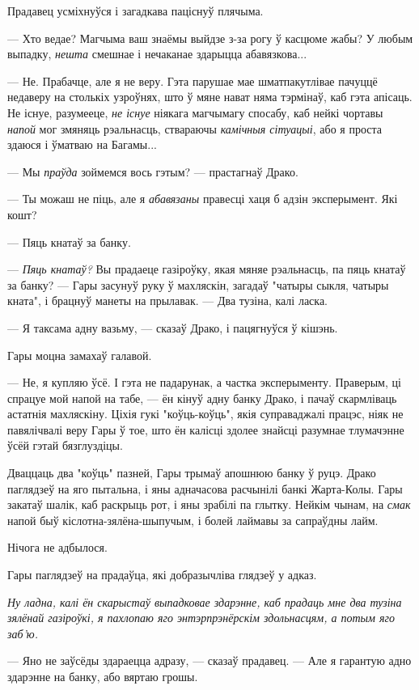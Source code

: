Прадавец усміхнуўся і загадкава паціснуў плячыма.

--- Хто ведае? Магчыма ваш знаёмы выйдзе з-за рогу ў касцюме жабы?
У любым выпадку, \emph{нешта} смешнае і нечаканае здарыцца абавязкова...

--- Не. Прабачце, але я не веру. Гэта парушае мае шматпакутлівае пачуццё недаверу на
столькіх узроўнях, што ў мяне нават няма тэрмінаў, каб гэта апісаць.
Не існуе, разумееце, \emph{не існуе} ніякага магчымагу спосабу, каб нейкі
чортавы \emph{напой} мог змяняць рэальнасць, ствараючы \emph{камічныя сітуацыі}, 
або я проста здаюся і ўматваю на Багамы...

--- Мы \emph{праўда} зоймемся вось гэтым? --- прастагнаў Драко.

--- Ты можаш не піць, але я \emph{абавязаны} правесці хаця б адзін эксперымент. 
Які кошт?

--- Пяць кнатаў за банку.

--- \emph{Пяць кнатаў?} Вы прадаеце газіроўку, якая мяняе рэальнасць, па пяць кнатаў
за банку? --- Гары засунуў руку ў махляскін, загадаў "чатыры сыкля, чатыры кната",
і брацнуў манеты на прылавак. --- Два тузіна, калі ласка.

--- Я таксама адну вазьму, --- сказаў Драко, і пацягнуўся ў кішэнь.

Гары моцна замахаў галавой. 

--- Не, я купляю ўсё. І гэта не падарунак, а частка эксперыменту. Праверым, ці
спрацуе мой напой на табе, --- ён кінуў адну банку Драко, і пачаў скармліваць астатнія
махляскіну. Ціхія гукі "коўць-коўць", якія суправаджалі працэс, ніяк не павялічвалі
веру Гары ў тое, што ён калісці здолее знайсці разумнае тлумачэнне ўсёй гэтай
бязглуздіцы. 

Дваццаць два "коўць" пазней, Гары трымаў апошнюю банку ў руцэ. Драко паглядзеў на
яго пытальна, і яны адначасова расчынілі банкі Жарта-Колы. Гары закатаў шалік, 
каб раскрыць рот, і яны зрабілі па глытку. Нейкім чынам, на \emph{смак} напой быў
кіслотна-зялёна-шыпучым, і болей лаймавы за сапраўдны лайм.

Нічога не адбылося.

Гары паглядзеў на прадаўца, які добразычліва глядзеў у адказ.


\emph{Ну ладна, калі ён скарыстаў выпадковае здарэнне, каб прадаць мне два тузіна 
зялёнай газіроўкі, я пахлопаю яго энтэрпрэнёрскім здольнасцям, а потым яго заб'ю.}

--- Яно не заўсёды здараецца адразу, --- сказаў прадавец. --- Але я гарантую адно 
здарэнне на банку, або вяртаю грошы.

